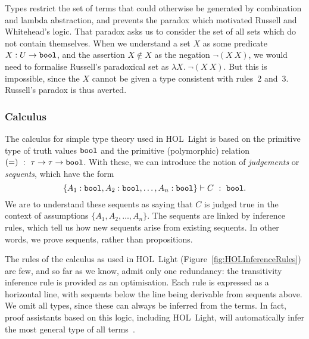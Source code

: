 Types restrict the set of terms that could otherwise be generated by combination and lambda abstraction, and prevents the paradox which motivated Russell and Whitehead's logic. That paradox asks us to consider the set of all sets which do not contain themselves. When we understand a set $X$ as some predicate $X:U \rightarrow \texttt{bool}$, and the assertion $X \not\in X$ as the negation $\neg(X\ X)$, we would need to formalise Russell's paradoxical set as $\lambda X.\; \neg(X\ X)$. But this is impossible, since the $X$ cannot be given a type consistent with rules~2 and~3. Russell's paradox is thus averted.

\subsubsection{Calculus}\label{sec:HOLInferenceRules}
The calculus for simple type theory used in HOL~Light is based on the primitive type of truth values $\texttt{bool}$ and the primitive (polymorphic) relation $(=)\ :\ \tau \rightarrow \tau \rightarrow \texttt{bool}$. With these, we can introduce the notion of \emph{judgements} or \emph{sequents}, which have the form
\begin{displaymath}
\{A_1:\texttt{bool},A_2:\texttt{bool},\ldots,A_n:\texttt{bool}\} \vdash C\ :\ \texttt{bool}.
\end{displaymath}
We are to understand these sequents as saying that $C$ is judged true in the context of assumptions $\{A_1,A_2,\ldots,A_n\}$. The sequents are linked by inference rules, which tell us how new sequents arise from existing sequents. In other words, we prove sequents, rather than propositions.

The rules of the calculus as used in HOL~Light (Figure~\ref{fig:HOLInferenceRules}) are few, and so far as we know, admit only one redundancy: the transitivity inference rule is provided as an optimisation. Each rule is expressed as a horizontal line, with sequents below the line being derivable from sequents above. We omit all types, since these can always be inferred from the terms. In fact, proof assistants based on this logic, including HOL~Light, will automatically infer the most general type of all terms~\cite{HindleyMilner}.

